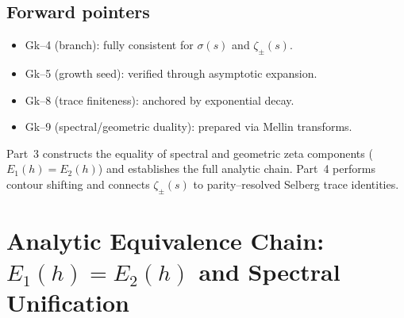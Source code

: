 \subsection{Forward pointers}
\label{subsec:ch6-part2-forward} \relax

\begin{itemize}[leftmargin=*, itemsep=2pt]
  \item Gk–4 (branch): fully consistent for $\sigma(s)$ and $\zeta_\pm(s)$. %
  \item Gk–5 (growth seed): verified through asymptotic expansion. %
  \item Gk–8 (trace finiteness): anchored by exponential decay. %
  \item Gk–9 (spectral/geometric duality): prepared via Mellin transforms. %
\end{itemize}

Part~3 constructs the equality of spectral and geometric zeta components ($E_1(h)=E_2(h)$) and establishes the full analytic chain.  
Part~4 performs contour shifting and connects $\zeta_\pm(s)$ to parity–resolved Selberg trace identities. %



\section{Analytic Equivalence Chain: $E_1(h)=E_2(h)$ and Spectral Unification}
\label{sec:ch6-part3-analytic-equivalence-chain} \relax \hspace{0pt}

